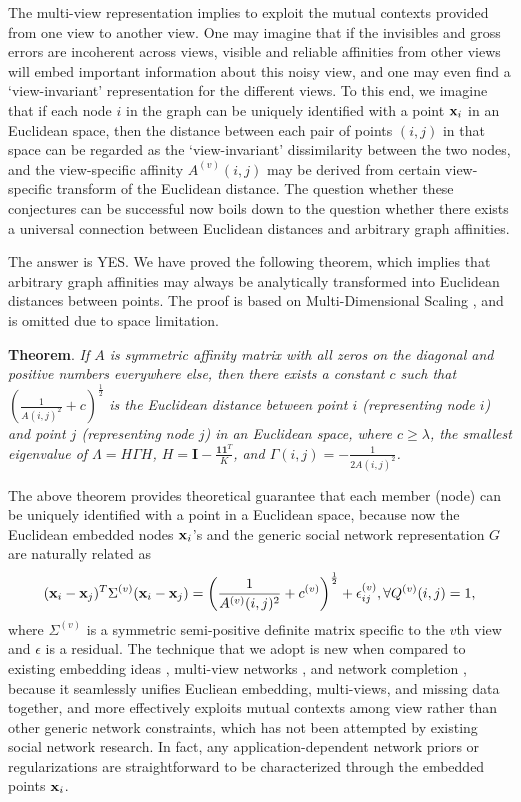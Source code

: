 The multi-view representation implies to exploit the mutual contexts provided from one view to another view. One may imagine that if the invisibles and gross errors are incoherent across views, visible and reliable affinities from other views will embed important information about this noisy view, and one may even find a `view-invariant' representation for the different views. To this end, we imagine that if each node $i$ in the graph can be uniquely identified with a point ${\bf x}_i$ in an Euclidean space, then the distance between each pair of points $(i,j)$ in that space can be regarded as the `view-invariant' dissimilarity between the two nodes, and the view-specific affinity $A^{(v)}(i,j)$ may be derived from certain view-specific transform of the Euclidean distance. The question whether these conjectures can be successful now boils down to the question whether there exists a universal connection between Euclidean distances and arbitrary graph affinities.

The answer is YES. We have proved the following theorem, which implies that arbitrary graph affinities may always be analytically transformed into Euclidean distances between points. The proof is based on Multi-Dimensional Scaling \cite{CoxMDS}, and is omitted due to space limitation.

\vspace{5pt}
\textbf{Theorem}. \textit{If $A$ is symmetric affinity matrix with all zeros on the diagonal and positive numbers everywhere else, then there exists a constant $c$ such that $(\frac{1}{A(i,j)^2}+c)^{\frac{1}{2}}$ is the Euclidean distance between point $i$ (representing node $i$) and point $j$ (representing node $j$) in an Euclidean space, where $c\geq\lambda$, the smallest eigenvalue of $\Lambda=H\Gamma H$, $H=\mathbf{I}-\frac{\mathbf{1}\mathbf{1}^T}{K}$, and $\Gamma(i,j)=-\frac{1}{2A(i,j)^2}$.} 
\vspace{5pt}


The above theorem provides theoretical guarantee that each member (node) can be uniquely identified with a point in a Euclidean space, because now the Euclidean embedded nodes ${\bf x}_i$'s and the generic social network representation $G$ are naturally related as
\begin{equation}\label{eq:embed}
({\bf x}_i-{\bf x}_j)^{T}\Sigma^{(v)}({\bf x}_i-{\bf x}_j)=\left(\frac{1}{A^{(v)}(i,j)^2}+c^{(v)}\right)^{\frac{1}{2}}+\epsilon^{(v)}_{ij}, \forall Q^{(v)}(i,j)=1,
\end{equation}
where $\Sigma^{(v)}$ is a symmetric semi-positive definite matrix specific to the $v$th view and $\epsilon$ is a residual. The technique that we adopt is new when compared to existing embedding ideas \cite{Hoff01latentspace,Hancocklatent}, multi-view networks \cite{AiroldiBFX08,Kim12}, and network completion \cite{Clauset,Guimera,HannekeX09,KimL11}, because it seamlessly unifies Eucliean embedding, multi-views, and missing data together, and more effectively exploits mutual contexts among view rather than other generic network constraints, which has not been attempted by existing social network research. In fact, any application-dependent network priors or regularizations are straightforward to be characterized through the embedded points ${\bf x}_i$. 


